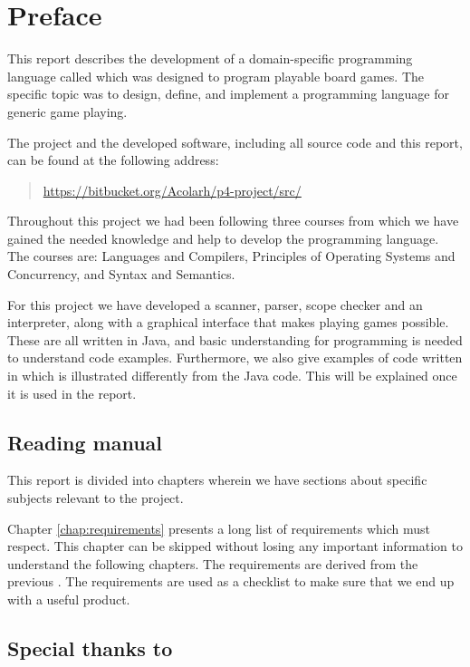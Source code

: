\chapter*{Preface}
\label{chap:preface}

This report describes the development of a domain-specific programming
language called \productname{} which was designed to program playable board games. The 
specific topic was to design, define, and implement a programming language for 
generic game playing. 

The project and the developed software, including all source code and
this report, can be found at the following address:

\begin{quote}
  \url{https://bitbucket.org/Acolarh/p4-project/src/}  
\end{quote}

Throughout this project we had been following three courses from which we have
gained the needed knowledge and help to develop the programming language. The
courses are: Languages and Compilers, Principles of Operating Systems and
Concurrency, and Syntax and Semantics.

For this project we have developed a scanner, parser, scope checker and
an interpreter, along with a graphical interface that makes playing
games possible. These are all written in Java, and basic understanding
for programming is needed to understand code examples. Furthermore,
we also give examples of code written in \productname{} which is
illustrated differently from the Java code. This will be explained once
it is used in the report.

\section*{Reading manual}

This report is divided into chapters wherein we have sections about specific
subjects relevant to the project.

Chapter \ref{chap:requirements} presents a long list of requirements which
\productname{} must respect. This chapter can be skipped without losing any
important information to understand the following chapters. The requirements are 
derived from the previous . The requirements are used as
a checklist to make sure that we end up with a useful product.

\section*{Special thanks to}

